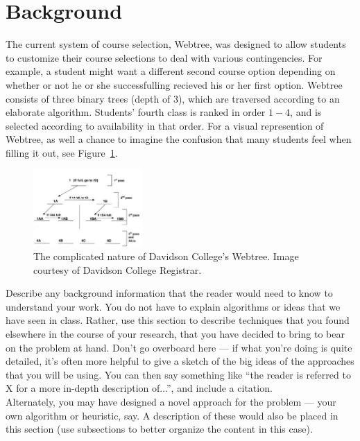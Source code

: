 
\section{Background}
\label{sec:background}

The current system of course selection, Webtree, was designed to allow
students to customize their course selections to deal with various
contingencies. For example, a student might want a different second
course option depending on whether or not he or she successfulling
recieved his or her first option. Webtree consists of three binary trees (depth
of $3$), which are traversed according to an elaborate
algorithm. Students' fourth class is ranked in order $1-4$, and is
selected according to availability in that order. For a visual
represention of Webtree, as well a chance to imagine the confusion that
many students feel when filling it out, see Figure~\ref{fig:webtr}.

\begin{figure}[htb]
  \centering  %
  \includegraphics[width=0.37\textwidth]{figs/webtree.jpg}
  \caption{The complicated nature of Davidson College's Webtree. Image
    courtesy of Davidson College Registrar.}
  \label{fig:webtr}
\end{figure}

Describe any background information that the reader would need to know
to understand your work. You do not have to explain algorithms or
ideas that we have seen in class. Rather, use this section to describe
techniques that you found elsewhere in the course of your research,
that you have decided to bring to bear on the problem at hand. Don't
go overboard here --- if what you're doing is quite detailed, it's
often more helpful to give a sketch of the big ideas of the approaches
that you will be using. You can then say something like ``the reader
is referred to X for a more in-depth description of...'', and include
a citation.\\

Alternately, you may have designed a novel approach for the problem
--- your own algorithm or heuristic, say. A description of these would
also be placed in this section (use subsections to better organize the
content in this case).




